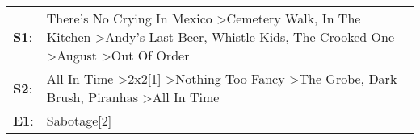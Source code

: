 \begin{supertabular}{p{0.03\textwidth}p{0.92\textwidth}}
 \textbf{S1}:  &  There's No Crying In Mexico\textsuperscript{} \textgreater \enspace Cemetery Walk\textsuperscript{}, \enspace In The Kitchen\textsuperscript{} \textgreater \enspace Andy's Last Beer\textsuperscript{}, \enspace Whistle Kids\textsuperscript{}, \enspace The Crooked One\textsuperscript{} \textgreater \enspace August\textsuperscript{} \textgreater \enspace Out Of Order\textsuperscript{}  \enspace  \\
 \textbf{S2}:  &                                                                          All In Time\textsuperscript{} \textgreater \enspace 2x2[1]\textsuperscript{} \textgreater \enspace Nothing Too Fancy\textsuperscript{} \textgreater \enspace The Grobe\textsuperscript{}, \enspace Dark Brush\textsuperscript{}, \enspace Piranhas\textsuperscript{} \textgreater \enspace All In Time\textsuperscript{}  \enspace  \\
 \textbf{E1}:  &                                                                                                                                                                                                                                                                                                                                                                     Sabotage[2]\textsuperscript{}  \enspace  \\
\end{supertabular}
